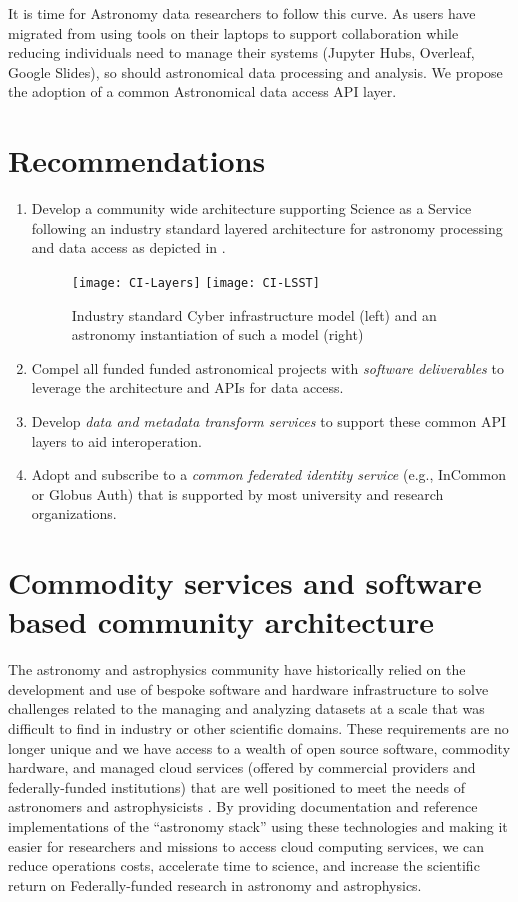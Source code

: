 It is time for Astronomy data researchers to follow this curve. As users have migrated
from using tools on their laptops to support collaboration while reducing
individuals need to manage their systems (Jupyter Hubs, Overleaf, Google Slides),
so should astronomical data processing and analysis. We propose the adoption of
a common Astronomical data access \gls{API} layer.


\section{Recommendations }
\begin{enumerate}
 \item Develop a community wide architecture supporting Science as a Service following
	an industry  standard layered architecture for astronomy processing and data access as
depicted in .


\begin{figure}
\centering
\texttt{[image: CI-Layers]}
\texttt{[image: CI-LSST]}
\caption{Industry standard Cyber infrastructure model (left) and an astronomy instantiation of such a model (right)\label{fig:ci}}
\end{figure}

\item Compel all funded funded astronomical projects with \emph{software deliverables} to  leverage the architecture and  APIs for data access.

\item Develop \emph{data and \gls{metadata} transform services}
to support these common \gls{API} layers to aid interoperation.

\item Adopt and subscribe to a \emph{common federated identity service} (e.g., InCommon or
Globus Auth) that is supported by most university and research organizations.
\end{enumerate}




\section{Commodity services and software based community architecture} \label{sec:refarc}
The astronomy and astrophysics community have historically relied on the development and use of bespoke software and hardware infrastructure to solve challenges related to the managing and analyzing datasets at a scale that was difficult to find in industry or other scientific domains.
These requirements are no longer unique and we have access to a wealth of open source software, commodity hardware, and managed cloud services (offered by commercial providers and federally-funded institutions) that are well positioned to meet the needs of astronomers and astrophysicists \citep{2019AAS...23345706M, 2019AAS...23324505B}.
By providing documentation and reference implementations of the “astronomy \gls{stack}” using these technologies and making it easier for researchers and missions to access cloud computing services, we can reduce operations costs, accelerate time to science, and increase the scientific return on Federally-funded research in astronomy and astrophysics.


